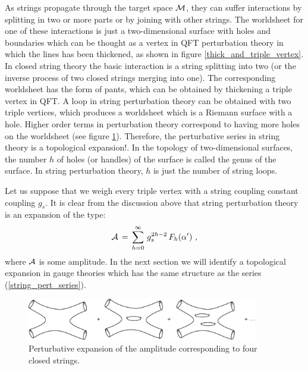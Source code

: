 \documentclass[12pt,notitlepage,a4paper]{article}
\newcommand{\beq}{\begin{equation}}
\newcommand{\eeq}{\end{equation}}
\begin{document}
As strings propagate through the target space ${\cal M}$, they can suffer interactions by splitting in two or more parts or by joining with other strings. The worldsheet for one of these interactions is just a two-dimensional surface with holes and boundaries which can be thought as a vertex in QFT perturbation theory in which the lines has been thickened, as shown in figure \ref{thick_and_triple_vertex}. In closed string theory the basic interaction is a string splitting into two (or the inverse process of two closed strings merging into one). The corresponding worldsheet has the form of pants, which can be obtained by thickening a triple vertex in QFT. A loop in string perturbation theory can be obtained with two triple vertices, which produces a worldsheet which is a Riemann surface with a hole. Higher order terms in perturbation theory correspond to having more holes on the worldsheet (see figure \ref{stringperturbation}). Therefore, the perturbative series in string theory is a topological expansion!. In the topology of two-dimensional  surfaces, the number $h$ of holes (or handles) of the surface  is called the genus of the surface. In string perturbation theory, $h$ is just the number of string loops. 

Let us suppose that we weigh every triple vertex with a string coupling constant  coupling $g_s$.  It is clear from the discussion above that  string perturbation theory is an expansion of the type:
\beq
{\cal A}\,=\,\sum_{h=0}^{\infty}\, g_s^{2h-2}\,F_h(\alpha')\,\,,
\label{string_pert_series}
\eeq
where ${\cal A}$ is some amplitude. In the next section we will identify a topological expansion in gauge theories which has the same structure as the series (\ref{string_pert_series}). 

\begin{figure}[ht]
\center
\includegraphics[width=0.9\textwidth]{flotadorespatitas.pdf}
\caption{Perturbative expansion of the amplitude corresponding to four closed strings. } 
\label{stringperturbation}
\end{figure}
\end{document}
